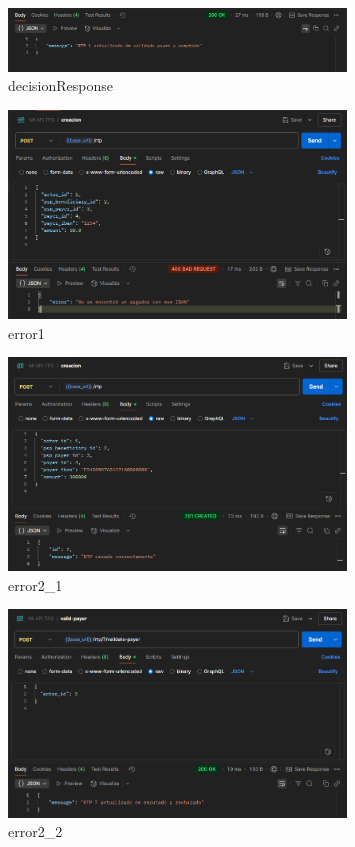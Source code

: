     \begin{figure}[H]
    \centering
    \includegraphics[width=0.8\textwidth]{Imagenes/decisionResponse.png}
    \caption{decisionResponse}
    \label{fig:decisionResponse}
    \end{figure}



    \begin{figure}[H]
    \centering
    \includegraphics[width=0.8\textwidth]{Imagenes/error1.png}
    \caption{error1}
    \label{fig:error1}
    \end{figure}

    \begin{figure}[H]
    \centering
    \includegraphics[width=0.8\textwidth]{Imagenes/error2_1.png}
    \caption{error2\_1}
    \label{fig:error2_1}
    \end{figure}

    \begin{figure}[H]
    \centering
    \includegraphics[width=0.8\textwidth]{Imagenes/error2_2.png}
    \caption{error2\_2}
    \label{fig:error2_2}
    \end{figure}


